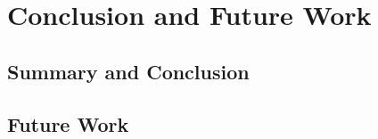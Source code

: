 \chapter{Conclusion and Future Work} \label{ch:chapter4}
\section{Summary and Conclusion}
\section{Future Work}
